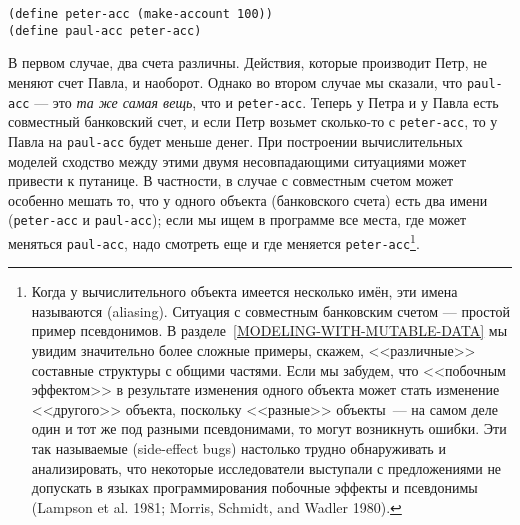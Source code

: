 \begin{Verbatim}[fontsize=\small]
(define peter-acc (make-account 100))
(define paul-acc peter-acc)
\end{Verbatim}
В первом случае, два счета различны. Действия, которые производит
Петр, не меняют счет Павла, и наоборот.  Однако во втором случае мы
сказали, что {\tt paul-acc} --- это {\em та же самая
вещь}, что и {\tt peter-acc}.  Теперь у Петра и у Павла
есть  совместный
банковский счет, и если Петр возьмет сколько-то с
{\tt peter-acc}, то у Павла на
{\tt paul-acc} будет меньше денег.  При построении вычислительных моделей сходство
между этими двумя несовпадающими ситуациями может привести к путанице.  В
частности, в случае с совместным счетом может особенно мешать то,
что у одного объекта (банковского счета) есть два имени
({\tt peter-acc} и {\tt paul-acc});  если мы ищем в
программе все места, где может меняться {\tt paul-acc}, надо
смотреть еще и где меняется {\tt peter-acc}\footnote{Когда у вычислительного объекта имеется
  несколько имён, эти имена называются
   (aliasing). Ситуация с совместным
  банковским счетом --- простой пример псевдонимов.  В
  разделе~\ref{MODELING-WITH-MUTABLE-DATA} мы увидим значительно
  более сложные примеры, скажем, <<различные>> составные структуры с
  общими частями.  Если мы забудем, что <<побочным эффектом>> в
  результате изменения одного объекта может  стать изменение <<другого>>
  объекта, поскольку
  <<разные>> объекты~--- на самом деле один и тот же под разными
  псевдонимами, то могут возникнуть
  ошибки.  Эти
  так называемые
   (side-effect bugs)
  настолько трудно обнаруживать и анализировать, что некоторые исследователи
  выступали с предложениями не допускать в языках программирования
  побочные эффекты и псевдонимы (Lampson et
  al. 1981;
  Morris, Schmidt, and Wadler
  1980).}.

